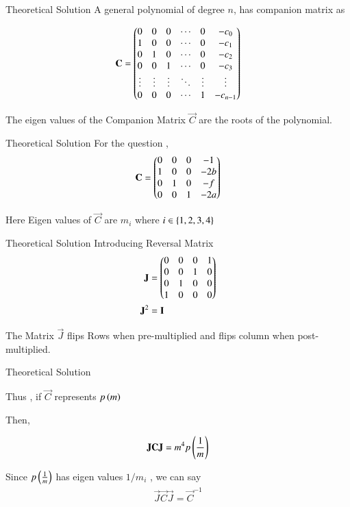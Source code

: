 \documentclass{beamer}
\begin{document}
\begin{frame}{Theoretical Solution}
A general polynomial of degree $n$, has companion matrix as

\begin{align}
   \mathbf{C} = \begin{pmatrix}0 & 0 & 0 & \cdots & 0 & -c_{0} \\
1 & 0 & 0 & \cdots & 0 & -c_{1} \\
0 & 1 & 0 & \cdots & 0 & -c_{2} \\
0 & 0 & 1 & \cdots & 0 & -c_{3} \\
\vdots & \vdots & \vdots & \ddots & \vdots & \vdots \\
0 & 0 & 0 & \cdots & 1 & -c_{n-1}\end{pmatrix}
\end{align}

The eigen values of the Companion Matrix $\vec{C}$ are the roots of the polynomial.
\end{frame}
\begin{frame}{Theoretical Solution}
For the question , 
\begin{align}
    \mathbf{C} = \begin{pmatrix}0&0&0&-1\\
                     1&0&0&-2b\\
                     0&1&0&-f\\
                     0&0&1&-2a\end{pmatrix}
\end{align}

Here Eigen values of $\vec{C}$ are $m_i$ where $i \in \left\{1,2,3,4\right\}$
\end{frame}

\begin{frame}{Theoretical Solution}
Introducing Reversal Matrix 
\begin{align}
    \mathbf{J} &= \begin{pmatrix}0&0&0&1\\0&0&1&0\\0&1&0&0\\1&0&0&0\end{pmatrix} \\ 
    \mathbf{J}^2 &= \mathbf{I} \label{eq_2}
\end{align}

The Matrix $\vec{J}$ flips Rows when pre-multiplied and flips column when post-multiplied.
\end{frame}

\begin{frame}{Theoretical Solution}

Thus , if $\vec{C}$ represents $p\left(m\right)$

Then,

\begin{align}
    \mathbf{J}\mathbf{C}\mathbf{J} = m^4p\left(\frac{1}{m}\right)
\end{align}

Since $p\left(\frac{1}{m}\right)$ has eigen values $1/m_i$ , we can say 
\begin{align}
    \vec{J}\vec{C}\vec{J} = \vec{C}^{-1} \\
\end{align}
\end{frame}
\end{document}
